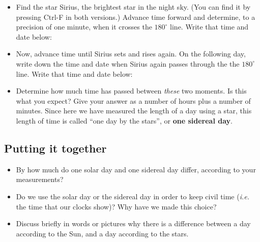 \documentclass[11pt]{article}
\begin{document}
\begin{itemize}
	\item Find the star Sirius, the brightest star in the night sky. (You can find it by pressing Ctrl-F in both versions.)
		Advance time forward and determine, to a precision of one minute, when it crosses the $180^\circ$ line. Write that time 
		and date 
		below: 
		
		\vspace{1in}

	\item Now, advance time until Sirius sets and rises again. On the following day, write down the time and date when Sirius 
		again passes through the the $180^\circ$ line. Write that time
                and date
                below: 

		\vspace{1in}

	\item Determine how much time has passed between {\it these} two moments. Is this what you expect? Give your answer as 
		a number of hours plus a number of minutes. Since here we have measured the length of a day using a star, this 
		length of time is called ``one day by the stars'', or {\bf one sidereal day}.

		\vspace{2in}
\end{itemize}

\newpage

\subsection{Putting it together}

\begin{itemize}

	\item By how much do one solar day and one sidereal day differ, according to your measurements?

		\vspace{1in}

	\item Do we use the solar day or the sidereal day in order to keep civil time ({\it i.e.} the time that our clocks show)? 
		Why have we made this choice?

		\vspace{2in}

	\item Discuss briefly in words or pictures why there is a difference between a day according to the Sun, and a day according to the stars.
\end{itemize}
\end{document}
